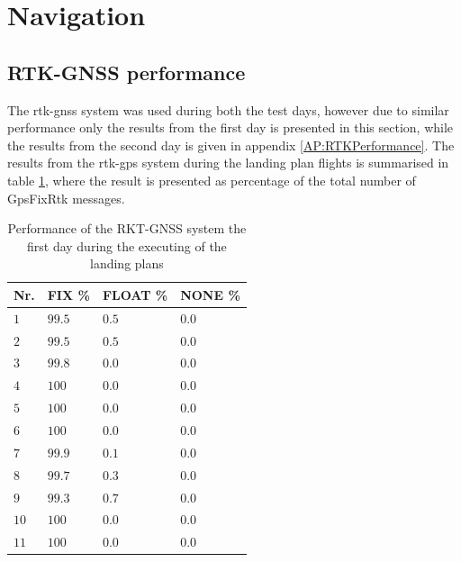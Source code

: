 \section{Navigation}\label{ss:EXNavigation}
\subsection{RTK-GNSS performance}
The \gls{rtk-gnss} system was used during both the test days, however due to similar performance only the results from the first day is presented in this section, while the results from the second day is given in appendix \ref{AP:RTKPerformance}. The results from the \gls{rtk-gps} system during the landing plan flights is summarised in table \ref{TB:RTKFirstDayRTK}, where the result is presented as percentage of the total number of GpsFixRtk messages.
\begin{table}[H]
\centering
\begin{tabular}{| l | l | l | l |}
\hline
\textbf{Nr.}	& \textbf{FIX \%}	& \textbf{FLOAT \%}	& \textbf{NONE \%}	\\ \hline
$1$				& $99.5 $	& $0.5$	& $0.0$									\\ \hline
$2$				& $99.5 $	& $0.5$	& $0.0$									\\ \hline
$3$				& $99.8 $	& $0.0$	& $0.0$									\\ \hline
$4$				& $100$		& $0.0$	& $0.0$									\\ \hline
$5$				& $100$		& $0.0$	& $0.0$									\\ \hline
$6$				& $100$		& $0.0$	& $0.0$									\\ \hline
$7$				& $99.9$	& $0.1$	& $0.0$									\\ \hline
$8$				& $99.7 $ 	& $0.3$	& $0.0$									\\ \hline
$9$				& $99.3$	& $0.7$	& $0.0$									\\ \hline
$10$			& $100$		& $0.0$	& $0.0$									\\ \hline
$11$			& $100$		& $0.0$	& $0.0$									\\ \hline
\end{tabular}
\caption{Performance of the RKT-GNSS system the first day during the executing of the landing plans}
\label{TB:RTKFirstDayRTK}
\end{table}
